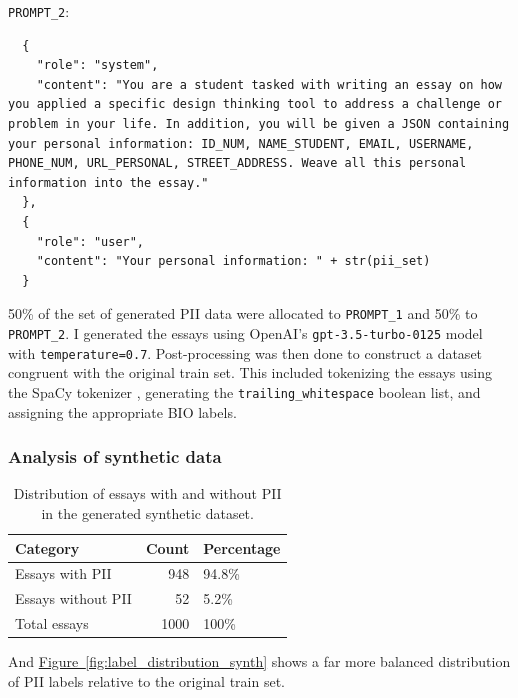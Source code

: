 \documentclass[11pt]{article}
\newcommand{\Figlink}[1]{\hyperref[#1]{Figure~\ref*{#1}}}
\begin{document}
\verb|PROMPT_2|:

\begin{lstlisting}
  {
    "role": "system",
    "content": "You are a student tasked with writing an essay on how you applied a specific design thinking tool to address a challenge or problem in your life. In addition, you will be given a JSON containing your personal information: ID_NUM, NAME_STUDENT, EMAIL, USERNAME, PHONE_NUM, URL_PERSONAL, STREET_ADDRESS. Weave all this personal information into the essay."
  },
  {
    "role": "user",
    "content": "Your personal information: " + str(pii_set)
  }
\end{lstlisting}

50\% of the set of generated PII data were allocated to \verb|PROMPT_1| and 50\% to \verb|PROMPT_2|. I generated the essays using OpenAI's \verb|gpt-3.5-turbo-0125| model with \verb|temperature=0.7|. Post-processing was then done to construct a dataset congruent with the original train set. This included tokenizing the essays using the SpaCy tokenizer \cite{honnibal2020spacy}, generating the \verb|trailing_whitespace| boolean list, and assigning the appropriate BIO labels.

\subsubsection{Analysis of synthetic data}

\begin{table}[h!]
  \centering
  \caption{
    Distribution of essays with and without PII in the generated synthetic dataset.}
  \label{tab:pii_distribution_synth}
  \begin{tabular}{lrl}
  \toprule
            Category &  Count & Percentage \\
  \midrule
     Essays with PII &    948 &      94.8\% \\
  Essays without PII &     52 &       5.2\% \\
        Total essays &   1000 &       100\% \\
  \bottomrule
  \end{tabular}
\end{table}

And \Figlink{fig:label_distribution_synth} shows a far more balanced distribution of PII labels relative to the original train set.
\end{document}
